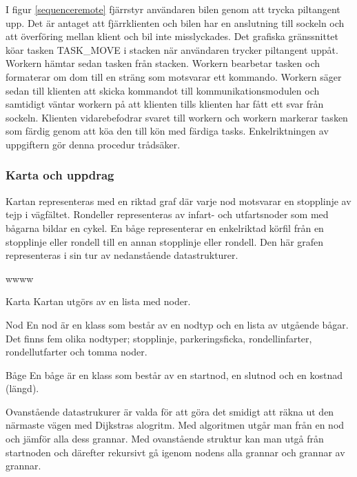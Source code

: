 \documentclass[tekniskrapport/tech.tex]{subfiles}
\begin{document}
I figur \ref{sequenceremote} fjärrstyr användaren bilen genom att trycka
piltangent upp. Det är antaget att fjärrklienten och bilen har en anslutning
till sockeln och att överföring mellan klient och bil inte misslyckades. Det
grafiska gränssnittet köar tasken TASK\_MOVE i stacken när användaren trycker
piltangent uppåt. Workern hämtar sedan tasken från stacken. Workern bearbetar
tasken och formaterar om dom till en sträng som motsvarar ett kommando. Workern
säger sedan till klienten att skicka kommandot till kommunikationsmodulen och
samtidigt väntar workern på att klienten tills klienten har fått ett svar från
sockeln. Klienten vidarebefodrar svaret till workern och workern markerar tasken
som färdig genom att köa den till kön med färdiga tasks. Enkelriktningen av uppgiftern
gör denna procedur trådsäker.


\subsubsection{Karta och uppdrag}
\label{sec:mission}
Kartan representeras med en riktad graf där varje nod motsvarar en stopplinje
av tejp i vägfältet. Rondeller representeras av infart- och utfartsnoder som
med bågarna bildar en cykel. En båge representerar en enkelriktad körfil från
en stopplinje eller rondell till en annan stopplinje eller rondell. Den här
grafen representeras i sin tur av nedanstående datastrukturer.

\begin{labeling}{wwww}
    \item[Karta] Kartan utgörs av en lista med noder.

    \item[Nod] En nod är en klass som består av en nodtyp och en lista
        av utgående bågar. Det finns fem olika nodtyper; stopplinje,
        parkeringsficka, rondellinfarter, rondellutfarter och tomma noder. 

    \item[Båge] En båge är en klass som består av en startnod, en slutnod och
    en kostnad (längd).
        
\end{labeling}
Ovanstående datastrukurer är valda för att göra det smidigt att räkna ut den
närmaste vägen med Dijkstras alogritm. Med algoritmen utgår man från en nod och
jämför alla dess grannar. Med ovanstående struktur kan man utgå från startnoden
och därefter rekursivt gå igenom nodens alla grannar och grannar av grannar.
\end{document}
